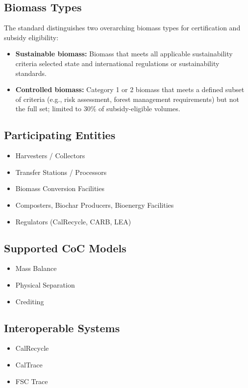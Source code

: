 \documentclass{article}
\begin{document}
\subsection*{Biomass Types}
The standard distinguishes two overarching biomass types for certification and subsidy eligibility:
\begin{itemize}[noitemsep]
    \item \textbf{Sustainable biomass:} Biomass that meets all applicable sustainability criteria selected state and international regulations or sustainability standards. 
    \item \textbf{Controlled biomass:} Category 1 or 2 biomass that meets a defined subset of criteria (e.g., risk assessment, forest management requirements) but not the full set; limited to 30\% of subsidy-eligible volumes.
\end{itemize}

\subsection*{Participating Entities}
\begin{itemize}[noitemsep]
    \item Harvesters / Collectors
    \item Transfer Stations / Processors
    \item Biomass Conversion Facilities
    \item Composters, Biochar Producers, Bioenergy Facilities
    \item Regulators (CalRecycle, CARB, LEA)
\end{itemize}

\subsection*{Supported CoC Models}
\begin{itemize}[noitemsep]
    \item Mass Balance
    \item Physical Separation
    \item Crediting
\end{itemize}

\subsection*{Interoperable Systems}
\begin{itemize}[noitemsep]
    \item CalRecycle
    \item CalTrace
    \item FSC Trace
\end{itemize}
\end{document}
